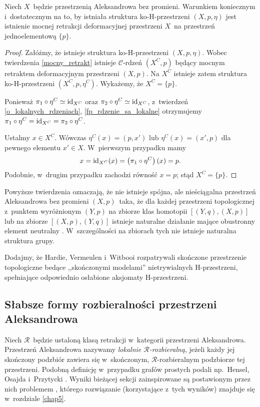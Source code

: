 \begin{stw}\label{stw-helmsutlera-vaughna}
Niech $X$~będzie przestrzenią Aleksandrowa bez promieni. Warunkiem koniecznym i~dostatecznym na to, by istniała struktura ko-H-przestrzeni $(X,p,\eta)$ jest istnienie mocnej retrakcji deformacyjnej przestrzeni $X$~na przestrzeń jednoelementową $\{p\}$.
\end{stw}
\begin{proof}
Załóżmy, że istnieje struktura ko-H-przestrzeni $(X,p,\eta)$.
Wobec twierdzenia \ref{mocny_retrakt} istnieje $\mathcal{C}$-rdzeń $(X^C,p)$ będący mocnym retraktem deformacyjnym przestrzeni $(X,p)$. Na $X^C$ istnieje zatem struktura ko-H-przestrzeni $(X^C,p,\eta^C)$. Wykażemy, że $X^C=\{p\}$.

Ponieważ $\pi_1\circ \eta^C\simeq \operatorname{id}_{X^C}$ oraz $\pi_2\circ \eta^C \simeq \operatorname{id}_{X^C}$, z~twierdzeń \ref{o_lokalnych_rdzeniach}, \ref{fp_rdzenie_sa_lokalne} otrzymujemy $\pi_1\circ \eta^C=\operatorname{id}_{X^C}=\pi_2\circ \eta^C$.

Ustalmy $x\in X^C$. Wówczas $\eta^C(x)=(p,x')$ lub $\eta^C(x)=(x',p)$ dla pewnego elementu $x'\in X$. W~pierwszym przypadku mamy \[x=\operatorname{id}_{X^C}(x)=\left(\pi_1\circ\eta^C\right)(x)=p.\] Podobnie, w~drugim przypadku zachodzi równość $x=p$; stąd $X^C=\{p\}$.
\end{proof}

Powyższe twierdzenia oznaczają, że nie istnieje spójna, ale nieściągalna przestrzeń Aleksandrowa bez promieni $(X,p)$~taka, że dla każdej przestrzeni topologicznej z~punktem wyróżnionym $(Y,p)$ na  zbiorze klas homotopii $[(Y,q),(X,p)]$ lub na zbiorze $[(X,p),(Y,q)]$ istnieje naturalne działanie mające obustronny element neutralny \cite[Propositions 2.2.3, 2.2.9]{Arkowitz11}. W~szczególności na zbiorach tych nie istnieje naturalna struktura grupy.

Dodajmy, że Hardie, Vermeulen i~Witbooi \cite{Hardie02} rozpatrywali skończone przestrzenie topologiczne bedące ,,skończonymi modelami'' nietrywialnych \mbox{H-przestrzeni}, spełniające odpowiednio osłabione aksjomaty \mbox{H-przestrzeni}.



\subsection{Słabsze formy rozbieralności przestrzeni Aleksandrowa}
Niech $\mathcal{R}$~będzie ustaloną klasą retrakcji w~kategorii przestrzeni Aleksandrowa. Przestrzeń Aleksandrowa nazywamy \textit{lokalnie $\mathcal{R}$-rozbieralną}, jeżeli każdy jej skończony podzbiór zawiera się w~skończonym, $\mathcal{R}$-rozbieralnym podzbiorze tej przestrzeni. Podobną definicję w~przypadku grafów prostych podali np.~Hensel, Osajda i~Przytycki \cite{Hensel14}. Wyniki bieżącej sekcji zainspirowane są postawionym przez nich problemem \cite[Question 2.11]{Hensel14}, którego rozwiązanie (korzystające z~tych wyników) znajduje się w~rozdziale \ref{chap5}.


